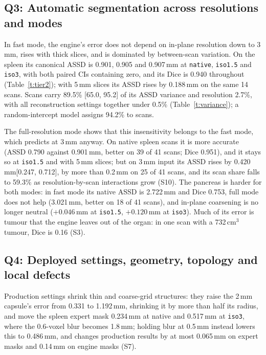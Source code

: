 \documentclass[conference]{IEEEtran}
\newcommand{\lvl}[1]{\texttt{#1}}
\newcommand{\mm}{\,mm\xspace}
\begin{document}
\subsection{Q3: Automatic segmentation across resolutions and modes}
In fast mode, the engine's error does not depend on in-plane resolution down to 3\mm, rises with thick slices, and is dominated by between-scan variation. On the spleen its canonical ASSD is 0.901, 0.905 and 0.907\mm at \lvl{native}, \lvl{iso1.5} and \lvl{iso3}, with both paired CIs containing zero, and its Dice is 0.940 throughout (Table~\ref{t:tier2}); with 5\mm slices its ASSD rises by 0.188\mm on the same 14 scans. Scans carry 89.5\% [65.0, 95.2] of its ASSD variance and resolution 2.7\%, with all reconstruction settings together under 0.5\% (Table~\ref{t:variance}); a random-intercept model assigns 94.2\% to scans.

The full-resolution mode shows that this insensitivity belongs to the fast mode, which predicts at 3\mm anyway. On native spleen scans it is more accurate (ASSD 0.790 against 0.901\mm, better on 39 of 41 scans; Dice 0.951), and it stays so at \lvl{iso1.5} and with 5\mm slices; but on 3\mm input its ASSD rises by 0.420\mm [0.247, 0.712], by more than 0.2\mm on 25 of 41 scans, and its scan share falls to 59.3\% as resolution-by-scan interactions grow (S10). The pancreas is harder for both modes: in fast mode its native ASSD is 2.722\mm and Dice 0.753, full mode does not help (3.021\mm, better on 18 of 41 scans), and in-plane coarsening is no longer neutral ($+0.046$\mm at \lvl{iso1.5}, $+0.120$\mm at \lvl{iso3}). Much of its error is tumour that the engine leaves out of the organ: in one scan with a 732\,cm$^3$ tumour, Dice is 0.16 (S3).

\begin{table}[!t]
\caption{Descriptive main-effect shares of ASSD variance ($\eta^2$, \%) across the tested grid, with 95\% CIs from a bootstrap over placements within shape (T1) or over scans (T2). TS: TotalSegmentator fast (full mode in S10). T1 interactions + residual include placement replication (2.2\%); a small negative remainder arises where \lvl{slice5} lacks some scans, so main effects are not orthogonal. $^a$Variance between scans in a random-intercept model on the levels that resample every scan: a different estimand from $\eta^2$ (Section~V).}
\label{t:variance}
\centering\scriptsize
\setlength{\tabcolsep}{3pt}

\end{table}

\subsection{Q4: Deployed settings, geometry, topology and local defects}
Production settings shrink thin and coarse-grid structures: they raise the 2\mm capsule's error from 0.331 to 1.192\mm, shrinking it by more than half its radius, and move the spleen expert mask 0.234\mm at native and 0.517\mm at \lvl{iso3}, where the 0.6-voxel blur becomes 1.8\mm; holding blur at 0.5\mm instead lowers this to 0.486\mm, and changes production results by at most 0.065\mm on expert masks and 0.14\mm on engine masks (S7).
\end{document}
